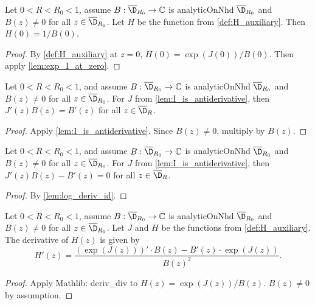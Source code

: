 \begin{lemma}\label{lem:H_at_zero}
\leanok
{}
Let $0<R<R_0<1$, assume $B:\overline{\D}_{R_0}\to\mathbb{C}$ is analyticOnNhd $\overline{\D}_{R_0}$ and $B(z) \ne 0$ for all $z \in \overline{\D}_{R_0}$. Let $H$ be the function from \cref{def:H_auxiliary}. Then $H(0)=1/B(0)$.
\end{lemma}
\begin{proof}
\leanok
By \cref{def:H_auxiliary} at $z=0$, $H(0) = \exp(J(0))/B(0)$. Then apply \cref{lem:exp_I_at_zero}.
\end{proof}

\begin{lemma}\label{lem:log_deriv_id}
\leanok
{}
Let $0<R<R_0<1$, and assume $B:\overline{\D}_{R_0}\to\mathbb{C}$ is analyticOnNhd $\overline{\D}_{R_0}$ and $B(z) \ne 0$ for all $z \in \overline{\D}_{R_0}$. For $J$ from \cref{lem:I_is_antiderivative}, then $J'(z)B(z) = B'(z)$ for all $z \in \overline{\D}_R$.
\end{lemma}
\begin{proof}
\leanok
{}
Apply \cref{lem:I_is_antiderivative}. Since $B(z) \ne 0$, multiply by $B(z)$.
\end{proof}


\begin{lemma}\label{lem:log_deriv_identity}
\leanok
{}
Let $0<R<R_0<1$, and assume $B:\overline{\D}_{R_0}\to\mathbb{C}$ is analyticOnNhd $\overline{\D}_{R_0}$ and $B(z) \ne 0$ for all $z \in \overline{\D}_{R_0}$. For $J$ from \cref{lem:I_is_antiderivative}, then $J'(z)B(z) - B'(z) = 0$ for all $z \in \overline{\D}_R$.
\end{lemma}
\begin{proof}
\leanok
By \cref{lem:log_deriv_id}.
\end{proof}


\begin{lemma}[Derivative of $H(z)$]\label{lem:H_derivative_quotient_rule}
\leanok
Let $0<R<R_0<1$, assume $B:\overline{\D}_{R_0}\to\mathbb{C}$ is analyticOnNhd $\overline{\D}_{R_0}$ and $B(z) \ne 0$ for all $z \in \overline{\D}_{R_0}$. Let $J$ and $H$ be the functions from \cref{def:H_auxiliary}. The derivative of $H(z)$ is given by
\[ H'(z) = \frac{(\exp(J(z)))' \cdot B(z) - B'(z) \cdot \exp(J(z))}{B(z)^2}. \]
\end{lemma}
\begin{proof}
\leanok
Apply Mathlib: deriv\_div to $H(z) = \exp(J(z))/B(z)$. $B(z) \ne 0$ by assumption.
\end{proof}

